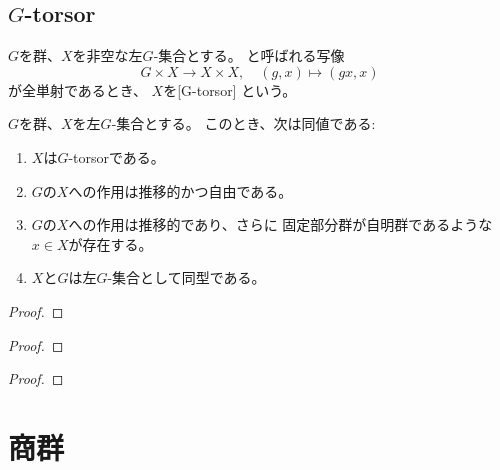 \documentclass[report]{jlreq}
\begin{document}
\subsection{$G$-torsor}

\begin{definition}[$G$-torsor]
    $G$を群、$X$を非空な左$G$-集合とする。
    と呼ばれる写像
    \begin{equation}
        G \times X \to X \times X,
        \quad
        (g, x) \mapsto (gx, x)
    \end{equation}
    が全単射であるとき、
    $X$を[G-torsor]
    という。
\end{definition}

\begin{proposition}
    $G$を群、$X$を左$G$-集合とする。
    このとき、次は同値である:
    \begin{enumerate}
        \item $X$は$G$-torsorである。
        \item $G$の$X$への作用は推移的かつ自由である。
        \item $G$の$X$への作用は推移的であり、さらに
            固定部分群が自明群であるような$x \in X$が存在する。
        \item $X$と$G$は左$G$-集合として同型である。
    \end{enumerate}
\end{proposition}

\begin{proof}
    \TODO{}
\end{proof}

\begin{theorem}[類等式]
    \TODO{}
\end{theorem}

\begin{proof}
    \TODO{}
\end{proof}

\begin{theorem}[Lagrange]
    \TODO{}
\end{theorem}

\begin{proof}
    \TODO{}
\end{proof}



%
\section{商群}
\end{document}
